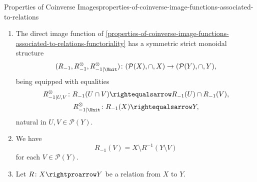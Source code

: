\begin{proposition}{Properties of Coinverse Images}{properties-of-coinverse-image-functions-associated-to-relations}
\begin{enumerate}
            \[
                (R_{-1},R^{\otimes}_{-1},R^{\otimes}_{-1|\Unit})
                \colon
                (\mathcal{P}(X),\cup,\emptyset)
                \to
                (\mathcal{P}(Y),\cup,\emptyset),
            \]%
            being equipped with inclusions%
            \[
                \begin{gathered}
                    R^{\otimes}_{-1|U,V}   \colon R_{-1}(U)\cup R_{-1}(V) \subset R_{-1}(U\cup V),\\
                    R^{\otimes}_{-1|\Unit} \colon \emptyset               \subset R_{-1}(\emptyset),
                \end{gathered}
            \]%
            natural in $U,V\in\mathcal{P}(Y)$.
        \item\label{properties-of-coinverse-image-functions-associated-to-relations-symmetric-strict-monoidality-with-respect-to-intersections}The direct image function of \cref{properties-of-coinverse-image-functions-associated-to-relations-functoriality} has a symmetric strict monoidal structure
            \[
                (R_{-1},R^{\otimes}_{-1},R^{\otimes}_{-1|\Unit})
                \colon
                (\mathcal{P}(X),\cap,X)
                \to
                (\mathcal{P}(Y),\cap,Y),
            \]%
            being equipped with equalities%
            \[
                \begin{gathered}
                    R^{\otimes}_{-1|U,V}   \colon R_{-1}(U\cap V) \rightequalsarrow R_{-1}(U)\cap R_{-1}(V),\\
                    R^{\otimes}_{-1|\Unit} \colon R_{-1}(X)       \rightequalsarrow Y,
                \end{gathered}
            \]%
            natural in $U,V\in\mathcal{P}(Y)$.
        \item\label{properties-of-coinverse-image-functions-associated-to-relations-interaction-with-inverse-images-1}We have
            \[
                R_{-1}(V)%
                =%
                X\setminus R^{-1}(Y\setminus V)
            \]%
            for each $V\in\mathcal{P}(Y)$.
        \item\label{properties-of-coinverse-image-functions-associated-to-relations-interaction-with-inverse-images-2}Let $R\colon X\rightproarrow Y$ be a relation from $X$ to $Y$.
            \begin{enumerate}

\end{enumerate}
\end{enumerate}
\end{proposition}
